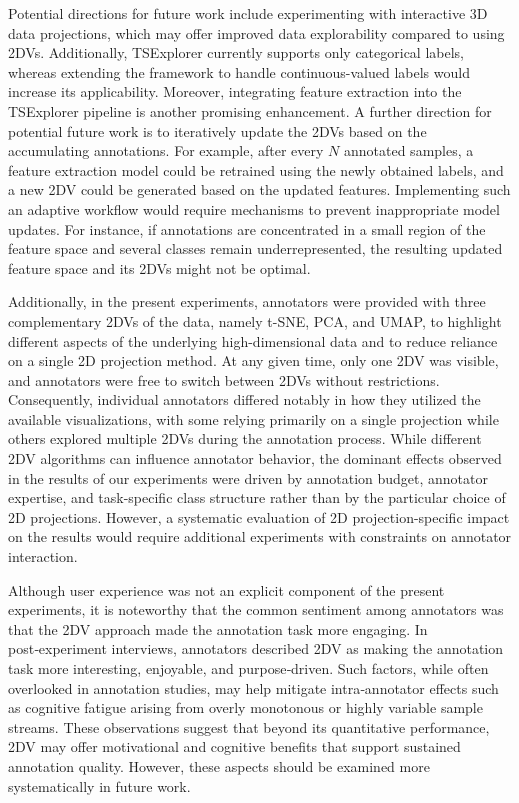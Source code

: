 \documentclass[a4paper,fleqn]{cas-dc}
\begin{document}
Potential directions for future work include experimenting with interactive 3D data projections, which may offer improved data explorability compared to using 2DVs. Additionally, TSExplorer currently supports only categorical labels, whereas extending the framework to handle continuous-valued labels would increase its applicability. Moreover, integrating feature extraction into the TSExplorer pipeline is another promising enhancement. A further direction for potential future work is to iteratively update the 2DVs based on the accumulating annotations. For example, after every $N$ annotated samples, a feature extraction model could be retrained using the newly obtained labels, and a new 2DV could be generated based on the updated features. Implementing such an adaptive workflow would require mechanisms to prevent inappropriate model updates. For instance, if annotations are concentrated in a small region of the feature space and several classes remain underrepresented, the resulting updated feature space and its 2DVs might not be optimal. 

Additionally, in the present experiments, annotators were provided with three complementary 2DVs of the data, namely t-SNE, PCA, and UMAP, to highlight different aspects of the underlying high-dimensional data and to reduce reliance on a single 2D projection method. At any given time, only one 2DV was visible, and annotators were free to switch between 2DVs without restrictions. Consequently, individual annotators differed notably in how they utilized the available visualizations, with some relying primarily on a single projection while others explored multiple 2DVs during the annotation process. While different 2DV algorithms can influence annotator behavior, the dominant effects observed in the results of our experiments were driven by annotation budget, annotator expertise, and task-specific class structure rather than by the particular choice of 2D projections. However, a systematic evaluation of 2D projection-specific impact on the results would require additional experiments with constraints on annotator interaction.

Although user experience was not an explicit component of the present experiments, it is noteworthy that the common sentiment among annotators was that the 2DV approach made the annotation task more engaging. In post‑experiment interviews, annotators described 2DV as making the annotation task more interesting, enjoyable, and purpose‑driven. Such factors, while often overlooked in annotation studies, may help mitigate intra‑annotator effects such as cognitive fatigue arising from overly monotonous or highly variable sample streams. These observations suggest that beyond its quantitative performance, 2DV may offer motivational and cognitive benefits that support sustained annotation quality. However, these aspects should be examined more systematically in future work.
\end{document}
